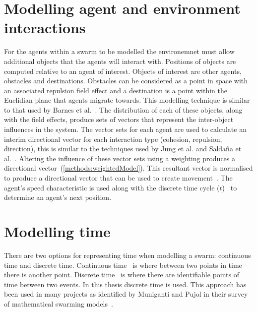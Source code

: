 \section{Modelling agent and environment interactions}\label{method:AgentEnvironmentModel}
For the agents within a swarm to be modelled  the environemnet must allow additional objects that the agents will interact with.
Positions of objects are computed relative to an agent of interest. Objects of interest are other agents, obstacles and destinations. Obstacles can be considered as a point in space with an associated repulsion field effect and a destination is a point within the Euclidian plane that agents migrate towards.
This modelling technique is similar to that used by Barnes et al.~\cite{BAF:06, BAFVM:06}. The distribution of each of these objects, along with the field effects, produce sets of vectors that represent the inter-object influences in the system. The vector sets for each agent are used to calculate an interim directional vector for each interaction type (cohesion, repulsion, direction), this is similar to the techniques used by Jung et al. and Saldaña et al.~\cite{JG:13, SOM:12}. Altering the influence of these vector sets using a weighting produces a directional vector~(\autoref{methods:weightedModel}). This resultant vector is normalised to produce a directional vector that can be used to create movement~\cite{KC:08}. The agent's speed characteristic is used along with the discrete time cycle ($t$)~\cite{FAP:05, GP:05} to determine an agent's next position.

\section{Modelling time}
There are two options for representing time when modelling a swarm: continuous time and discrete time. Continuous time~\cite{HW:08} is where between two points in time there is another point. Discrete time~\cite{FAP:05, GP:05, RVMH:13, HER:11, MP:10, PCL:08a} is where there are identifiable points of time between two events. In this thesis discrete time is used. This approach has been used in many projects as identified by Muniganti and Pujol in their survey of mathematical swarming models~\cite{MP:10}. 

